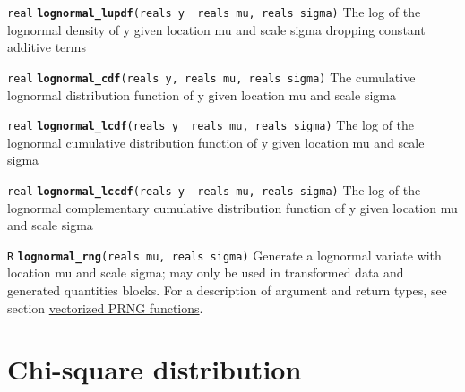 \documentclass[
  10pt,
]{book}
\begin{document}

\texttt{real} \textbf{\texttt{lognormal\_lupdf}}\texttt{(reals\ y\ \textbar{}\ reals\ mu,\ reals\ sigma)}\newline
The log of the lognormal density of y given location mu and scale
sigma dropping constant additive terms


\texttt{real} \textbf{\texttt{lognormal\_cdf}}\texttt{(reals\ y,\ reals\ mu,\ reals\ sigma)}\newline
The cumulative lognormal distribution function of y given location mu
and scale sigma


\texttt{real} \textbf{\texttt{lognormal\_lcdf}}\texttt{(reals\ y\ \textbar{}\ reals\ mu,\ reals\ sigma)}\newline
The log of the lognormal cumulative distribution function of y given
location mu and scale sigma


\texttt{real} \textbf{\texttt{lognormal\_lccdf}}\texttt{(reals\ y\ \textbar{}\ reals\ mu,\ reals\ sigma)}\newline
The log of the lognormal complementary cumulative distribution
function of y given location mu and scale sigma


\texttt{R} \textbf{\texttt{lognormal\_rng}}\texttt{(reals\ mu,\ reals\ sigma)}\newline
Generate a lognormal variate with location mu and scale sigma; may
only be used in transformed data and generated quantities blocks.
For a description of argument and return types, see section
\protect\hyperlink{prng-vectorization}{vectorized PRNG functions}.

\hypertarget{chi-square-distribution}{%
\section{Chi-square distribution}\label{chi-square-distribution}}
\end{document}
